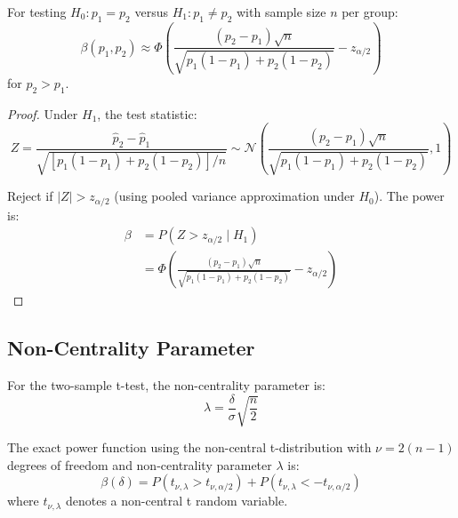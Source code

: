 \begin{theorem}
For testing $H_0: p_1 = p_2$ versus $H_1: p_1 \neq p_2$ with sample size $n$ per group:
\begin{equation}
\beta(p_1, p_2) \approx \Phi\left(\frac{(p_2-p_1)\sqrt{n}}{\sqrt{p_1(1-p_1) + p_2(1-p_2)}} - z_{\alpha/2}\right)
\end{equation}
for $p_2 > p_1$.
\end{theorem}

\begin{proof}
Under $H_1$, the test statistic:
\begin{equation}
Z = \frac{\hat{p}_2 - \hat{p}_1}{\sqrt{[p_1(1-p_1) + p_2(1-p_2)]/n}} \sim \mathcal{N}\left(\frac{(p_2-p_1)\sqrt{n}}{\sqrt{p_1(1-p_1) + p_2(1-p_2)}}, 1\right)
\end{equation}

Reject if $|Z| > z_{\alpha/2}$ (using pooled variance approximation under $H_0$). The power is:
\begin{align}
\beta &= P(Z > z_{\alpha/2} \mid H_1) \\
&= \Phi\left(\frac{(p_2-p_1)\sqrt{n}}{\sqrt{p_1(1-p_1) + p_2(1-p_2)}} - z_{\alpha/2}\right)
\end{align}
\end{proof}

\subsection{Non-Centrality Parameter}

\begin{definition}
For the two-sample t-test, the non-centrality parameter is:
\begin{equation}
\lambda = \frac{\delta}{\sigma}\sqrt{\frac{n}{2}}
\end{equation}
\end{definition}

\begin{theorem}
The exact power function using the non-central t-distribution with $\nu = 2(n-1)$ degrees of freedom and non-centrality parameter $\lambda$ is:
\begin{equation}
\beta(\delta) = P(t_{\nu, \lambda} > t_{\nu, \alpha/2}) + P(t_{\nu, \lambda} < -t_{\nu, \alpha/2})
\end{equation}
where $t_{\nu, \lambda}$ denotes a non-central t random variable.
\end{theorem}

